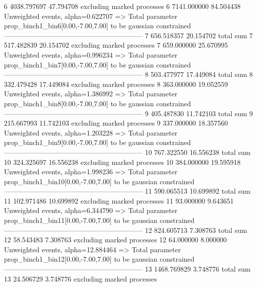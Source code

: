 6          4038.797697     47.794708       excluding marked processes    
6          7141.000000     84.504438       Unweighted events, alpha=0.622707
  => Total parameter prop_binch1_bin6[0.00,-7.00,7.00] to be gaussian constrained
------------------------------------------------------------
7          656.518357      20.154702       total sum                     
7          517.482839      20.154702       excluding marked processes    
7          659.000000      25.670995       Unweighted events, alpha=0.996234
  => Total parameter prop_binch1_bin7[0.00,-7.00,7.00] to be gaussian constrained
------------------------------------------------------------
8          503.477977      17.449084       total sum                     
8          332.479428      17.449084       excluding marked processes    
8          363.000000      19.052559       Unweighted events, alpha=1.386992
  => Total parameter prop_binch1_bin8[0.00,-7.00,7.00] to be gaussian constrained
------------------------------------------------------------
9          405.487830      11.742103       total sum                     
9          215.667993      11.742103       excluding marked processes    
9          337.000000      18.357560       Unweighted events, alpha=1.203228
  => Total parameter prop_binch1_bin9[0.00,-7.00,7.00] to be gaussian constrained
------------------------------------------------------------
10         767.322550      16.556238       total sum                     
10         324.325697      16.556238       excluding marked processes    
10         384.000000      19.595918       Unweighted events, alpha=1.998236
  => Total parameter prop_binch1_bin10[0.00,-7.00,7.00] to be gaussian constrained
------------------------------------------------------------
11         590.065513      10.699892       total sum                     
11         102.971486      10.699892       excluding marked processes    
11         93.000000       9.643651        Unweighted events, alpha=6.344790
  => Total parameter prop_binch1_bin11[0.00,-7.00,7.00] to be gaussian constrained
------------------------------------------------------------
12         824.605713      7.308763        total sum                     
12         58.543483       7.308763        excluding marked processes    
12         64.000000       8.000000        Unweighted events, alpha=12.884464
  => Total parameter prop_binch1_bin12[0.00,-7.00,7.00] to be gaussian constrained
------------------------------------------------------------
13         1468.769829     3.748776        total sum                     
13         24.506729       3.748776        excluding marked processes    
